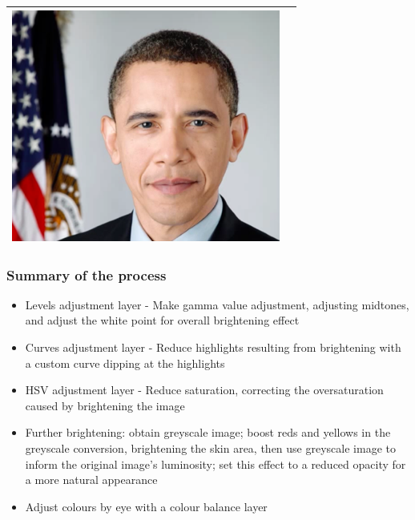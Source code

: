 \begin{longtable}{|c|c|}
\begin{minipage}{.29\textwidth}
    \includegraphics[width=\textwidth,height=\textheight,keepaspectratio]{images/obama_res}
  \end{minipage} \\
    \hline
\end{longtable}

\subsubsection*{Summary of the process}
\begin{itemize}
  \item Levels adjustment layer - Make gamma value adjustment, adjusting midtones, and adjust the white point for overall brightening effect
  \item Curves adjustment layer - Reduce highlights resulting from brightening with a custom curve dipping at the highlights
  \item HSV adjustment layer - Reduce saturation, correcting the oversaturation caused by brightening the image
  \item Further brightening: obtain greyscale image; boost reds and yellows in the greyscale conversion, brightening the skin area, then use greyscale image to inform the original image’s luminosity; set this effect to a reduced opacity for a more natural appearance
  \item Adjust colours by eye with a colour balance layer 
\end{itemize}
\pagebreak

